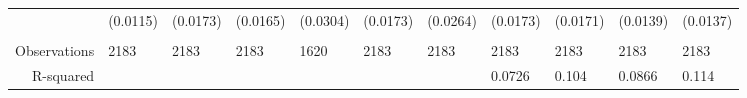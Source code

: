 \begin{tabular}{rrrrrrrrrrr}
      & \multicolumn{1}{l}{(0.0115)} & \multicolumn{1}{l}{(0.0173)} & \multicolumn{1}{l}{(0.0165)} & \multicolumn{1}{l}{(0.0304)} & \multicolumn{1}{l}{(0.0173)} & \multicolumn{1}{l}{(0.0264)} & \multicolumn{1}{l}{(0.0173)} & \multicolumn{1}{l}{(0.0171)} & \multicolumn{1}{l}{(0.0139)} & \multicolumn{1}{l}{(0.0137)} \\
      & \multicolumn{1}{l}{} & \multicolumn{1}{l}{} & \multicolumn{1}{l}{} & \multicolumn{1}{l}{} & \multicolumn{1}{l}{} & \multicolumn{1}{l}{} & \multicolumn{1}{l}{} & \multicolumn{1}{l}{} & \multicolumn{1}{l}{} & \multicolumn{1}{l}{} \\
Observations & \multicolumn{1}{l}{2183} & \multicolumn{1}{l}{2183} & \multicolumn{1}{l}{2183} & \multicolumn{1}{l}{1620} & \multicolumn{1}{l}{2183} & \multicolumn{1}{l}{2183} & \multicolumn{1}{l}{2183} & \multicolumn{1}{l}{2183} & \multicolumn{1}{l}{2183} & \multicolumn{1}{l}{2183} \\
R-squared & \multicolumn{1}{l}{} & \multicolumn{1}{l}{} & \multicolumn{1}{l}{} & \multicolumn{1}{l}{} & \multicolumn{1}{l}{} & \multicolumn{1}{l}{} & \multicolumn{1}{l}{0.0726} & \multicolumn{1}{l}{0.104} & \multicolumn{1}{l}{0.0866} & \multicolumn{1}{l}{0.114} \\
\bottomrule
\end{tabular}%
